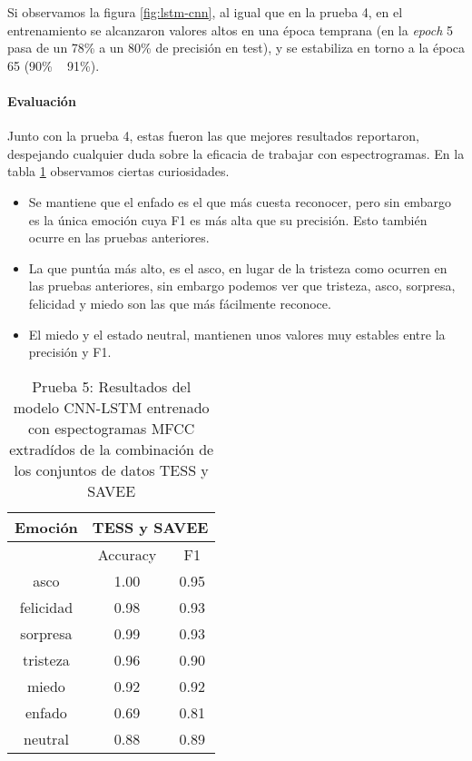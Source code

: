 \documentclass[11pt,a4paper,spanish]{book}
\begin{document}
	Si observamos la figura \ref{fig:lstm-cnn}, al igual que en la prueba 4, en el entrenamiento se alcanzaron valores altos en una época temprana (en la \emph{epoch} 5  pasa de un 78\% a un 80\% de precisión en test), y se estabiliza en torno a la época 65 (90\% ~ 91\%).

	\paragraph{Evaluación}
	Junto con la prueba 4, estas fueron las que mejores resultados reportaron, despejando cualquier duda sobre la eficacia de trabajar con espectrogramas. En la tabla \ref{result_Test5} observamos ciertas curiosidades.
	\begin{itemize}
		\item Se mantiene que el enfado es el que más cuesta reconocer, pero sin embargo es la única emoción cuya F1 es más alta que su precisión. Esto también ocurre en las pruebas anteriores.
		
		\item La que puntúa más alto, es el asco, en lugar de la tristeza como ocurren en las pruebas anteriores, sin embargo podemos ver que tristeza, asco, sorpresa, felicidad y miedo son las que más fácilmente reconoce. 
		
		\item El miedo y el estado neutral, mantienen unos valores muy estables entre la precisión y F1.
	\end{itemize}
	
	\begin{table}[H]
		\centering
		\begin{center}
			\begin{tabular}{| c|| c c | }
				\hline
				\multicolumn{1}{|c||}{Emoción} & 
				\multicolumn{2}{|c|}{TESS y SAVEE} \\
				\hline
				& 
				\multicolumn{1}{|c|}{Accuracy}&\multicolumn{1}{|c|}{F1}\\
				\hline
				asco 		& 1.00 & 0.95 \\
				felicidad 	& 0.98 & 0.93 \\
				sorpresa 	& 0.99 & 0.93 \\
				tristeza 	& 0.96 & 0.90 \\
				miedo 		& 0.92 & 0.92\\
				enfado 		& 0.69  & 0.81 \\
				neutral 	& 0.88 & 0.89\\
				\hline
			\end{tabular}
			
			\caption{Prueba 5: Resultados del modelo CNN-LSTM entrenado con espectogramas MFCC extradídos de la combinación de los conjuntos de datos TESS y SAVEE}
			\label{result_Test5}
		\end{center}
	\end{table}
	
\end{document}
